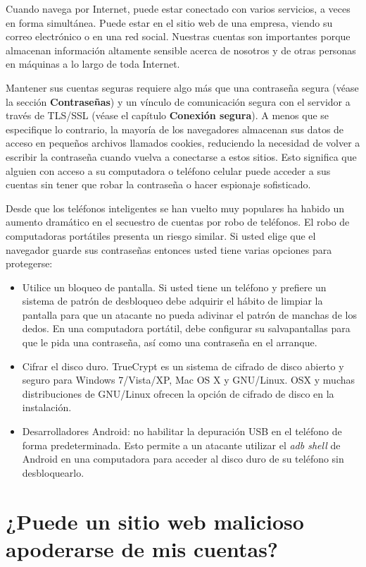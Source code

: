 \documentclass[10pt,a5paper,twoside,,]{book}
\providecommand{\tightlist}{%
  \setlength{\itemsep}{0pt}\setlength{\parskip}{0pt}}
\begin{document}
Cuando navega por Internet, puede estar conectado con varios servicios,
a veces en forma simultánea. Puede estar en el sitio web de una empresa,
viendo su correo electrónico o en una red social. Nuestras cuentas son
importantes porque almacenan información altamente sensible acerca de
nosotros y de otras personas en máquinas a lo largo de toda Internet.

Mantener sus cuentas seguras requiere algo más que una contraseña segura
(véase la sección \textbf{Contraseñas}) y un vínculo de comunicación
segura con el servidor a través de TLS/SSL (véase el capítulo
\textbf{Conexión segura}). A menos que se especifique lo contrario, la
mayoría de los navegadores almacenan sus datos de acceso en pequeños
archivos llamados cookies, reduciendo la necesidad de volver a escribir
la contraseña cuando vuelva a conectarse a estos sitios. Esto significa
que alguien con acceso a su computadora o teléfono celular puede acceder
a sus cuentas sin tener que robar la contraseña o hacer espionaje
sofisticado.

Desde que los teléfonos inteligentes se han vuelto muy populares ha
habido un aumento dramático en el secuestro de cuentas por robo de
teléfonos. El robo de computadoras portátiles presenta un riesgo
similar. Si usted elige que el navegador guarde sus contraseñas entonces
usted tiene varias opciones para protegerse:

\begin{itemize}
\tightlist
\item
  Utilice un bloqueo de pantalla. Si usted tiene un teléfono y prefiere
  un sistema de patrón de desbloqueo debe adquirir el hábito de limpiar
  la pantalla para que un atacante no pueda adivinar el patrón de
  manchas de los dedos. En una computadora portátil, debe configurar su
  salvapantallas para que le pida una contraseña, así como una
  contraseña en el arranque.
\item
  Cifrar el disco duro. TrueCrypt es un sistema de cifrado de disco
  abierto y seguro para Windows 7/Vista/XP, Mac OS X y GNU/Linux. OSX y
  muchas distribuciones de GNU/Linux ofrecen la opción de cifrado de
  disco en la instalación.
\item
  Desarrolladores Android: no habilitar la depuración USB en el teléfono
  de forma predeterminada. Esto permite a un atacante utilizar el
  \emph{adb shell} de Android en una computadora para acceder al disco
  duro de su teléfono sin desbloquearlo.
\end{itemize}

\section{¿Puede un sitio web malicioso apoderarse de mis
cuentas?}\label{puede-un-sitio-web-malicioso-apoderarse-de-mis-cuentas}
\end{document}
